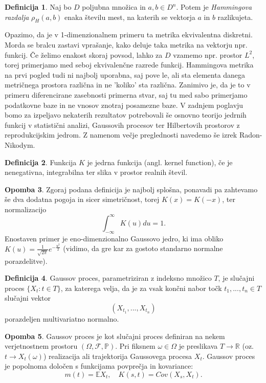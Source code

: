 \documentclass[12pt,a4paper]{amsart}
\theoremstyle{definition} %
\newtheorem{definicija}{Definicija}[section]
\newtheorem{opomba}[definicija]{Opomba}
\theoremstyle{plain} %
\begin{document}
\begin{definicija}
Naj bo $D$ poljubna množica in $a , b \in D^n$. Potem je  \textit{Hammingova razdalja} $\rho_H(a,b)$ enaka številu mest, na katerih se vektorja $a$ in $b$ razlikujeta.
\end{definicija}
Opazimo, da je v 1-dimenzionalnem primeru  ta metrika ekvivalentna diskretni. Morda se bralcu zastavi vprašanje, kako deluje taka metrika na vektorju npr. funkcij. Če želimo enakost skoraj povsod, lahko za $D$ vzamemo npr. prostor $L^2$, torej primerjamo med seboj ekvivalenčne razrede funkcij.  Hammingova metrika na prvi pogled tudi ni najbolj uporabna, saj pove le, ali sta elementa danega metričnega prostora različna in ne 'koliko' sta različna. Zanimivo je, da je to v primeru diferencirane zasebnosti primerna stvar, saj tu med sabo primerjamo podatkovne baze in ne vnosov znotraj posamezne baze. 
\newline
\newline
V zadnjem poglavju bomo za izpeljavo nekaterih rezultatov potrebovali še osnovno teorijo jedrnih funkcij v statistični analizi, Gaussovih procesov ter Hilbertovih prostorov z reprodukcijskim jedrom. Z namenom večje preglednosti navedemo še izrek Radon-Nikodym.
\begin{definicija}
Funkcija $K$ je jedrna funkcija (angl. kernel function), če je nenegativna, integrabilna ter slika v prostor realnih števil.
\end{definicija}
\begin{opomba}
Zgoraj podana definicija je najbolj splošna, ponavadi pa zahtevamo še dva dodatna pogoja in sicer simetričnost, torej $K(x) = K(-x)$, ter normalizacijo
$$
\int_{-\infty}^{\infty} K(u)du=1.
$$
Enostaven primer je eno-dimenzionalno Gaussovo jedro, ki ima obliko $K(u)=\frac{1}{\sqrt{2\pi}}e^{-\frac{u^2}{2}}$ (vidimo, da gre kar za gostoto standarno normalne porazdelitve).
\end{opomba}
\begin{definicija}
Gaussov proces, parametriziran z indeksno množico $T$, je slučajni proces $\{X_t : t \in T\}$, za katerega velja, da je za vsak končni nabor točk $t_1,...,t_n \in T$ slučajni vektor
$$
(X_{t_1},...,X_{t_n})
$$
porazdeljen multivariatno normalno.
\end{definicija}
\begin{opomba}
Gaussov proces je kot slučajni proces definiran na nekem verjetnostnem prostoru  $(\Omega, \mathcal{F}, \mathbb{P})$. Pri fiksnem $\omega \in \Omega$ je preslikava $T \rightarrow \mathbb{R}$ (oz. $t \rightarrow X_t(\omega)$) realizacija ali trajektorija Gaussovega procesa $X_t$. Gaussov proces je popolnoma določen s funkcijama povprečja  in kovariance: 
$$m(t) = \mathbb{E}X_t, \quad K(s,t) = Cov(X_s,X_t).$$
\end{opomba}
\end{document}
